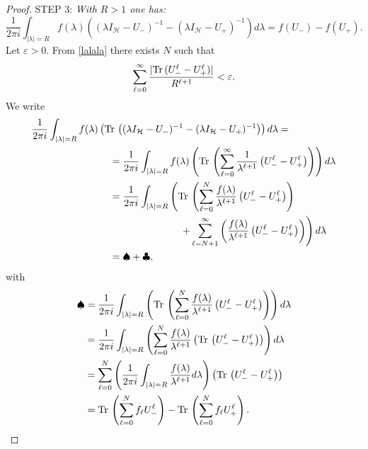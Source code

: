 \documentclass[12pt]{amsart}
\theoremstyle{definition}
\theoremstyle{remark}
\numberwithin{equation}{section}
\newcommand{\e}{\varepsilon}
\begin{document}
\begin{proof}
STEP 3: {\sl With  $R>1$ one has:
  \begin{equation}
    \frac{1}{2\pi i}\int_{|\lambda|=R}f(\lambda)\left(( \lambda I_{\mathcal H}-U_-)^{-1}-({\lambda}I_{\mathcal H}-U_+)^{-1}\right)d\lambda=f(U_-)-f(U_+).
    \label{trace-987}
  \end{equation}
}
Let $\e>0$. From \eqref{lalala} there exists $N$ such that
\begin{equation}
  \label{7-16}
\sum_{\ell=0}^\infty\frac{|{\rm Tr}\, (U_-^\ell-U_+^\ell)|}{R^{\ell+1}}<\e.
  \end{equation}
  We write
  \[
    \begin{split}
      \frac{1}{2\pi i}\int_{|\lambda|=R}f(\lambda)\left({\rm Tr}\,\left(( \lambda I_{\mathcal H}-U_-)^{-1}-({\lambda}I_{\mathcal H}-U_+)^{-1}\right)\right)d\lambda&=\\
      &\hspace{-6cm}=
        \frac{1}{2\pi i}\int_{|\lambda|=R}f(\lambda)\left({\rm Tr}\,
        \left(\sum_{\ell=0}^\infty \frac{1}{\lambda^{\ell+1}}\left(U_-^\ell
        -U_+^\ell\right)\right)\right)d\lambda\\                                                          &\hspace{-6cm}
                                                                                                            =\frac{1}{2\pi i}\int_{|\lambda|=R}\left({\rm Tr}\,\left(\sum_{\ell=0}^N
                                                                                                            \frac{f(\lambda)}{\lambda^{\ell+1}}\left(U_-^\ell-U_+^\ell
                                                                                                            \right)\right)\right.\\
      &\hspace{-3.5cm}\left.
        +\sum_{\ell=N+1}^\infty \left(\frac{f(\lambda)}{\lambda^{\ell+1}}\left(U_-^\ell
        -U_+^\ell\right)\right)\right)d\lambda\\
    &\hspace{-6cm}=\spadesuit+\clubsuit,\end{split}
\]
with
\[
  \begin{split}
    \spadesuit&=\frac{1}{2\pi i}\int_{|\lambda|=R}\left({\rm Tr}\,\left(\sum_{\ell=0}^N
                \frac{f(\lambda)}{\lambda^{\ell+1}}\left(U_-^\ell-U_+^\ell\right)
                \right)\right)d\lambda\\
              &=\frac{1}{2\pi i}\int_{|\lambda|=R}\left(\sum_{\ell=0}^N
                \frac{f(\lambda)}{\lambda^{\ell+1}}\left({\rm Tr}\,\left(U_-^\ell
                -U_+^\ell\right)\right)\right)d\lambda\\
              &=\sum_{\ell=0}^N\left(\frac{1}{2\pi i}\int_{|\lambda|=R}
                \frac{f(\lambda)}{\lambda^{\ell+1}}d\lambda\right)
                \left({\rm Tr}\,\left(U_-^\ell-U_+^\ell\right)\right)\\
              &={\rm Tr}\,\left(\sum_{\ell=0}^Nf_\ell U_-^\ell\right)-{\rm Tr}\,
                \left(\sum_{\ell=0}^Nf_\ell U_+^\ell\right).
              \end{split}
\]



\end{proof}
\end{document}
